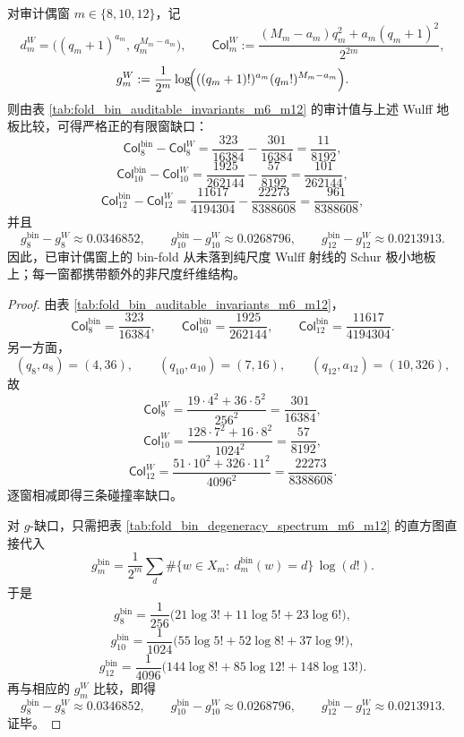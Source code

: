 \begin{proposition}\label{prop:xi-time-part9xaa-audited-even-windows-above-wulff-floor}
对审计偶窗 \(m\in\{8,10,12\}\)，记
\[
d_m^{W}=\bigl((q_m+1)^{a_m},\,q_m^{M_m-a_m}\bigr),
\qquad
\mathsf{Col}_m^{W}:=\frac{(M_m-a_m)q_m^2+a_m(q_m+1)^2}{2^{2m}},
\]
\[
g_m^{W}:=\frac1{2^m}\log\!\Bigl(((q_m+1)!)^{a_m}(q_m!)^{M_m-a_m}\Bigr).
\]
则由表 \ref{tab:fold_bin_auditable_invariants_m6_m12} 的审计值与上述 Wulff 地板比较，可得严格正的有限窗缺口：
\[
\mathsf{Col}_8^{\mathrm{bin}}-\mathsf{Col}_8^{W}
=
\frac{323}{16384}-\frac{301}{16384}
=
\frac{11}{8192},
\]
\[
\mathsf{Col}_{10}^{\mathrm{bin}}-\mathsf{Col}_{10}^{W}
=
\frac{1925}{262144}-\frac{57}{8192}
=
\frac{101}{262144},
\]
\[
\mathsf{Col}_{12}^{\mathrm{bin}}-\mathsf{Col}_{12}^{W}
=
\frac{11617}{4194304}-\frac{22273}{8388608}
=
\frac{961}{8388608},
\]
并且
\[
g_8^{\mathrm{bin}}-g_8^{W}\approx 0.0346852,
\qquad
g_{10}^{\mathrm{bin}}-g_{10}^{W}\approx 0.0268796,
\qquad
g_{12}^{\mathrm{bin}}-g_{12}^{W}\approx 0.0213913.
\]
因此，已审计偶窗上的 bin-fold 从未落到纯尺度 Wulff 射线的 Schur 极小地板上；每一窗都携带额外的非尺度纤维结构。
\end{proposition}
\begin{proof}
由表 \ref{tab:fold_bin_auditable_invariants_m6_m12}，
\[
\mathsf{Col}_8^{\mathrm{bin}}=\frac{323}{16384},
\qquad
\mathsf{Col}_{10}^{\mathrm{bin}}=\frac{1925}{262144},
\qquad
\mathsf{Col}_{12}^{\mathrm{bin}}=\frac{11617}{4194304}.
\]
另一方面，
\[
(q_8,a_8)=(4,36),\qquad
(q_{10},a_{10})=(7,16),\qquad
(q_{12},a_{12})=(10,326),
\]
故
\[
\mathsf{Col}_8^{W}=\frac{19\cdot 4^2+36\cdot 5^2}{256^2}=\frac{301}{16384},
\]
\[
\mathsf{Col}_{10}^{W}=\frac{128\cdot 7^2+16\cdot 8^2}{1024^2}=\frac{57}{8192},
\]
\[
\mathsf{Col}_{12}^{W}=\frac{51\cdot 10^2+326\cdot 11^2}{4096^2}=\frac{22273}{8388608}.
\]
逐窗相减即得三条碰撞率缺口。

对 \(g\)-缺口，只需把表 \ref{tab:fold_bin_degeneracy_spectrum_m6_m12} 的直方图直接代入
\[
g_m^{\mathrm{bin}}
=
\frac1{2^m}\sum_{d}\#\{w\in X_m:\ d_m^{\mathrm{bin}}(w)=d\}\,\log(d!).
\]
于是
\[
g_8^{\mathrm{bin}}
=
\frac1{256}\bigl(21\log 3!+11\log 5!+23\log 6!\bigr),
\]
\[
g_{10}^{\mathrm{bin}}
=
\frac1{1024}\bigl(55\log 5!+52\log 8!+37\log 9!\bigr),
\]
\[
g_{12}^{\mathrm{bin}}
=
\frac1{4096}\bigl(144\log 8!+85\log 12!+148\log 13!\bigr).
\]
再与相应的 \(g_m^{W}\) 比较，即得
\[
g_8^{\mathrm{bin}}-g_8^{W}\approx 0.0346852,\qquad
g_{10}^{\mathrm{bin}}-g_{10}^{W}\approx 0.0268796,\qquad
g_{12}^{\mathrm{bin}}-g_{12}^{W}\approx 0.0213913.
\]
证毕。
\end{proof}

